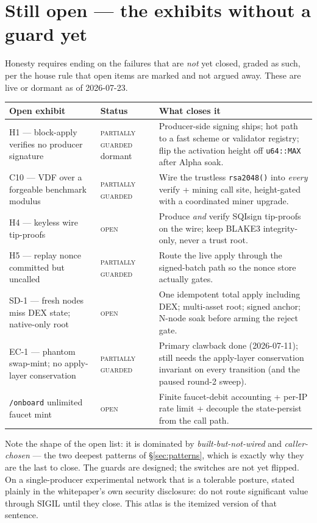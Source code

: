 \documentclass[10pt,a4paper]{article}
\newcommand{\rsPartial}{{\scriptsize\textcolor{sigilviolet}{\textsc{partially guarded}}}}
\newcommand{\rsOpen}{{\scriptsize\textcolor{sigilamber}{\textsc{open}}}}
\begin{document}
\section{Still open — the exhibits without a guard yet}\label{sec:open}

Honesty requires ending on the failures that are \emph{not} yet closed, graded as such,
per the house rule that open items are marked and not argued away. These are live or
dormant as of 2026-07-23.

\begin{center}
\small
{}
\renewcommand{\arraystretch}{1.4}
\begin{tabularx}{\textwidth}{@{}>{\RaggedRight\arraybackslash}p{5.0cm}l>{\RaggedRight\arraybackslash}X@{}}
\toprule
Open exhibit & Status & What closes it \\
\midrule
H1 — block-apply verifies no producer signature & \rsPartial{} dormant & Producer-side
signing ships; hot path to a fast scheme or validator registry; flip the activation
height off \texttt{u64::MAX} after Alpha soak. \\
C10 — VDF over a forgeable benchmark modulus & \rsPartial{} & Wire the trustless
\texttt{rsa2048()} into \emph{every} verify + mining call site, height-gated with a
coordinated miner upgrade. \\
H4 — keyless wire tip-proofs & \rsOpen{} & Produce \emph{and} verify SQIsign tip-proofs on
the wire; keep BLAKE3 integrity-only, never a trust root. \\
H5 — replay nonce committed but uncalled & \rsPartial{} & Route the live apply through the
signed-batch path so the nonce store actually gates. \\
SD-1 — fresh nodes miss DEX state; native-only root & \rsOpen{} & One idempotent total
apply including DEX; multi-asset root; signed anchor; N-node soak before arming the
reject gate. \\
EC-1 — phantom swap-mint; no apply-layer conservation & \rsPartial{} & Primary clawback
done (2026-07-11); still needs the apply-layer conservation invariant on every transition
(and the paused round-2 sweep). \\
\texttt{/onboard} unlimited faucet mint & \rsOpen{} & Finite faucet-debit accounting +
per-IP rate limit + decouple the state-persist from the call path. \\
\bottomrule
\end{tabularx}
\end{center}

Note the shape of the open list: it is dominated by \emph{built-but-not-wired} and
\emph{caller-chosen} — the two deepest patterns of \S\ref{sec:patterns}, which is exactly
why they are the last to close. The guards are designed; the switches are not yet flipped.
On a single-producer experimental network that is a tolerable posture, stated plainly in
the whitepaper's own security disclosure: do not route significant value through SIGIL
until they close. This atlas is the itemized version of that sentence.
\end{document}
